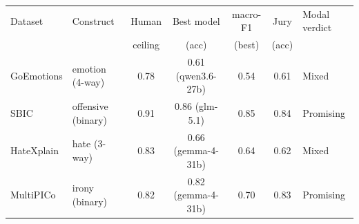 \begin{tabular}{@{}l l c c c c l@{}}
\toprule
Dataset & Construct & Human & Best model & macro-F1 & Jury & Modal verdict \\
 & & ceiling & (acc) & (best) & (acc) & \\
\midrule
GoEmotions & emotion (4-way) & 0.78 & 0.61 (qwen3.6-27b) & 0.54 & 0.61 & \cellcolor{a!60}Mixed \\
SBIC & offensive (binary) & 0.91 & 0.86 (glm-5.1) & 0.85 & 0.84 & \cellcolor{g!25}Promising \\
HateXplain & hate (3-way) & 0.83 & 0.66 (gemma-4-31b) & 0.64 & 0.62 & \cellcolor{a!60}Mixed \\
MultiPICo & irony (binary) & 0.82 & 0.82 (gemma-4-31b) & 0.70 & 0.83 & \cellcolor{g!25}Promising \\
\bottomrule
\end{tabular}